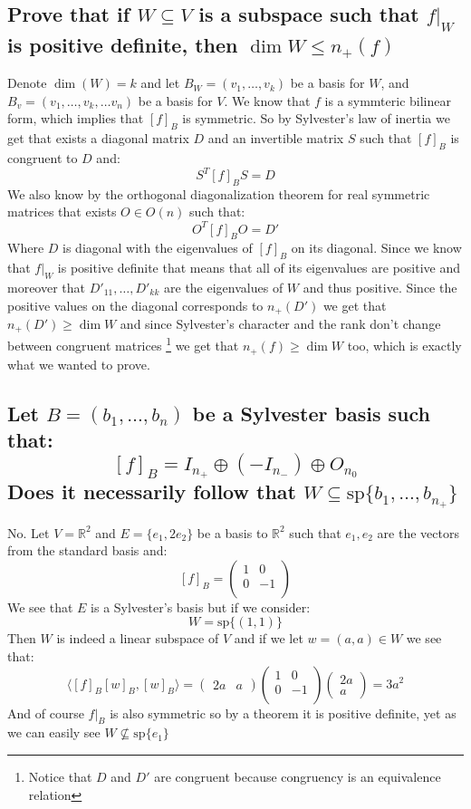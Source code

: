 \documentclass[11pt,a4paper]{article}
\theoremstyle{plain}
\newcommand{\R}{\mathbb{R}}
\newcommand{\ip}[2]{\langle #1, #2 \rangle}
\begin{document}
	\subsection{Prove that if $W\subseteq V$ is a subspace such that $f\vert_W$ 
	is positive definite, then $\dim W \le n_{+}(f)$}
	Denote $\dim (W) = k$ and
	let $B_W = (v_1,\dots,v_{k})$ be a basis for $W$, and
	$B_v = (v_1,\dots,v_{k},\dots v_n)$ be a basis for $V$.
	We know that $f$ is a symmteric bilinear form, which implies that $[f]_B$ is 
	symmetric. So by Sylvester's law of inertia we get that exists a diagonal 
	matrix $D$ and an invertible matrix $S$ such that $[f]_B$ is congruent to $D$ 
	and:
	\[
		S^{T}[f]_BS = D
	\]
	We also know by the orthogonal diagonalization theorem for real symmetric
	matrices that exists $O\in O(n)$ such that:
	\[
		O^{T}[f]_BO = D'
	\]
	Where $D$ is diagonal with the eigenvalues of $[f]_B$ on its diagonal.
	Since we know that $f\vert_W$ is positive definite that means that all
	of its eigenvalues are positive and moreover that $D'_{11},\dots,D'_{kk}$
	are the eigenvalues of $W$ and thus positive.
	Since the positive values on the diagonal corresponds to $n_+(D')$
	we get that $n_+(D') \geq \dim W$ and since Sylvester's character
	and the rank don't change between congruent matrices
	\footnote{Notice that $D$ and $D'$ are congruent because congruency
	is an equivalence relation} 
	we get that
	$n_+(f) \geq \dim W$ too, which is exactly what we wanted to prove.
	
	\newpage
	
	\subsection{Let $B = (b_1,\dots,b_n)$ be a Sylvester basis such that:
	\[
		[f]_B = I_{n_{+}} \oplus (-I_{n_{-}}) \oplus O_{n_{0}}
	\]
	Does it necessarily follow that 
	$W\subseteq \mathrm{sp}\{b_1,\dots,b_{n_{+}}\}$}
	No. Let $V = \R^2$ and $E = \{e_1,2e_2\}$ be a basis to $\R^2$ such that
	$e_1,e_2$ are the vectors from the standard basis and:
	\[
		[f]_B = 
		\begin{pmatrix}
			1 & 0 \\
			0 & -1 \\
		\end{pmatrix}
	\]
	We see that $E$ is a Sylvester's basis but if we consider:
	\[
		W = \mathrm{sp}\{(1,1)\}
	\]
	Then $W$ is indeed a linear subspace of $V$ and if we let $w=(a,a)\in W$
	we see that:
	\[
		\ip{[f]_B[w]_B}{[w]_B} = 
		\begin{pmatrix}
		2a & a
		\end{pmatrix}
		\begin{pmatrix}
			1 & 0 \\
			0 & -1 \\
		\end{pmatrix}
		\begin{pmatrix}
		2a \\ a
		\end{pmatrix} = 3a^2
	\]
	And of course $f\vert_B$ is also symmetric so by a theorem it is 
	positive definite, yet as we can easily see $W \nsubseteq \mathrm{sp}\{e_1\}$
	
\end{document}
